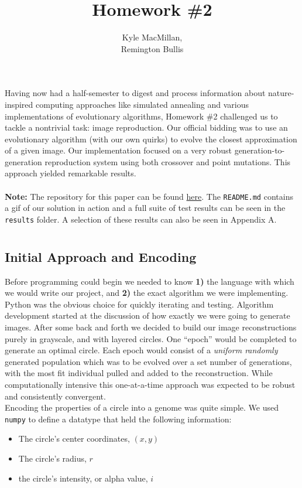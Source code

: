 \documentclass[12pt]{article}
\title{Homework \#2}
\author{Kyle MacMillan, \\Remington Bullis}
\begin{document}
\maketitle

Having now had a half-semester to digest and process information about nature-inspired computing approaches like simulated annealing and various implementations of evolutionary algorithms, Homework \#2 challenged us to tackle a nontrivial task: image reproduction. Our official bidding was to use an evolutionary algorithm (with our own quirks)  to evolve the closest approximation of a given image. Our implementation focused on a very robust generation-to-generation reproduction system using both crossover and point mutations. This approach yielded remarkable results. 
\\ \\
\textbf{Note: }The repository for this paper can be found \href{https://github.com/macattackftw/ncGA}{here}. 
The \verb|README.md| contains a gif of our solution in action and a full suite of test results can be seen in the \verb|results| folder. A selection of these results can also be seen in Appendix A. 

\section{} %

\subsection{Initial Approach and Encoding}
Before programming could begin we needed to know \textbf{1)} the language with which we would write our project, and \textbf{2)} the exact algorithm we were implementing. Python was the obvious choice for quickly iterating and testing. Algorithm development started at the discussion of how exactly we were going to generate images. After some back and forth we decided to build our image reconstructions purely in grayscale, and with layered circles. One ``epoch'' would be completed to generate an optimal circle. Each epoch would consist of a \textit{uniform randomly} generated population which was to be evolved over a set number of generations, with the most fit individual pulled and added to the reconstruction. While computationally intensive this one-at-a-time approach was expected to be robust and consistently convergent. 
\\
Encoding the properties of a circle into a genome was quite simple. We used \verb|numpy| to define a datatype that held the following information:
\begin{itemize}
\item The circle's center coordinates, $(x, y)$
\item The circle's radius, $r$
\item the circle's intensity, or alpha value, $i$
\end{itemize}
\end{document}
